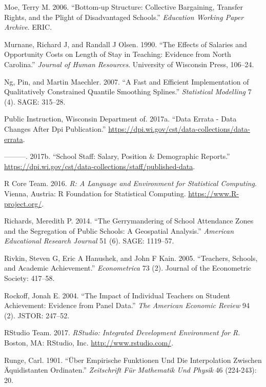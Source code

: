 \documentclass[12pt,]{article}
\begin{document}
\hypertarget{ref-moe}{}
Moe, Terry M. 2006. ``Bottom-up Structure: Collective Bargaining,
Transfer Rights, and the Plight of Disadvantaged Schools.''
\emph{Education Working Paper Archive}. ERIC.

\hypertarget{ref-murnane}{}
Murnane, Richard J, and Randall J Olsen. 1990. ``The Effects of Salaries
and Opportunity Costs on Length of Stay in Teaching: Evidence from North
Carolina.'' \emph{Journal of Human Resources}. University of Wisconsin
Press, 106--24.

\hypertarget{ref-ng}{}
Ng, Pin, and Martin Maechler. 2007. ``A Fast and Efficient
Implementation of Qualitatively Constrained Quantile Smoothing
Splines.'' \emph{Statistical Modelling} 7 (4). SAGE: 315--28.

\hypertarget{ref-dpi_errata}{}
Public Instruction, Wisconsin Department of. 2017a. ``Data Errata - Data
Changes After Dpi Publication.''
\url{https://dpi.wi.gov/cst/data-collections/data-errata}.

\hypertarget{ref-dpi}{}
---------. 2017b. ``School Staff: Salary, Position \& Demographic
Reports.''
\url{https://dpi.wi.gov/cst/data-collections/staff/published-data}.

\hypertarget{ref-r}{}
R Core Team. 2016. \emph{R: A Language and Environment for Statistical
Computing}. Vienna, Austria: R Foundation for Statistical Computing.
\url{https://www.R-project.org/}.

\hypertarget{ref-richards}{}
Richards, Meredith P. 2014. ``The Gerrymandering of School Attendance
Zones and the Segregation of Public Schools: A Geospatial Analysis.''
\emph{American Educational Research Journal} 51 (6). SAGE: 1119--57.

\hypertarget{ref-rivkin}{}
Rivkin, Steven G, Eric A Hanushek, and John F Kain. 2005. ``Teachers,
Schools, and Academic Achievement.'' \emph{Econometrica} 73 (2). Journal
of the Econometric Society: 417--58.

\hypertarget{ref-rockoff}{}
Rockoff, Jonah E. 2004. ``The Impact of Individual Teachers on Student
Achievement: Evidence from Panel Data.'' \emph{The American Economic
Review} 94 (2). JSTOR: 247--52.

\hypertarget{ref-rstudio}{}
RStudio Team. 2017. \emph{RStudio: Integrated Development Environment
for R}. Boston, MA: RStudio, Inc. \url{http://www.rstudio.com/}.

\hypertarget{ref-runge}{}
Runge, Carl. 1901. ``Über Empirische Funktionen Und Die Interpolation
Zwischen Äquidistanten Ordinaten.'' \emph{Zeitschrift Für Mathematik Und
Physik} 46 (224-243): 20.
\end{document}
